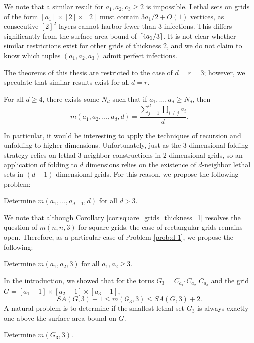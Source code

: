 We note that a similar result for $a_1, a_2,a_3 \geq 2$ is impossible. Lethal sets on grids of the form $[a_1] \times [2] \times [2]$ must contain $3a_1/2+O(1)$ vertices, as consecutive $[2]^2$ layers cannot harbor fewer than 3 infections. This differs significantly from the surface area bound of $\lceil4a_1/3\rceil$. It is not clear whether similar restrictions exist for other grids of thickness 2, and we do not claim to know which tuples $(a_1,a_2,a_3)$ admit perfect infections. 

The theorems of this thesis are restricted to the case of $d=r=3$; however, we speculate that similar results exist for all $d=r$. 

\begin{conj}
For all $d \geq 4$, there exists some $N_d$ such that if $a_1, \dots, a_d \geq N_d$, then
$$m(a_1,a_2, \dots, a_d,d) = \frac{\sum_{j=1}^d \prod_{i \neq j} a_i}{d}.$$
\end{conj}

In particular, it would be interesting to apply the techniques of recursion and unfolding to higher dimensions. Unfortunately, just as the 3-dimensional folding strategy relies on lethal 3-neighbor constructions in 2-dimensional grids, so an application of folding to $d$ dimensions relies on the existence of $d$-neighbor lethal sets in $(d-1)$-dimensional grids. For this reason, we propose the following problem:

\begin{prob}
\label{prob:d-1}
Determine $m(a_1, \dots, a_{d-1}, d)$ for all $d > 3$.
\end{prob}

We note that although Corollary \ref{cor:square_grids_thickness_1} resolves the question of $m(n,n,3)$ for square grids, the case of rectangular grids remains open. Therefore, as a particular case of Problem \ref{prob:d-1}, we propose the following:

\begin{prob}
\label{prob:rectangular_2d}
Determine $m(a_1,a_2, 3)$ for all $a_1,a_2 \geq 3$.
\end{prob}


In the introduction, we showed that for the torus $G_{3} = C_{a_1} \square C_{a_2} \square C_{a_3}$ and the grid $G = [a_1-1] \times [a_2-1] \times [a_3-1]$,
$$SA(G, 3) + 1 \leq m(G_3,3) \leq SA(G,3)+2.$$
A natural problem is to determine if the smallest lethal set $G_3$ is always exactly one above the surface area bound on $G$.

\begin{prob}
Determine $m(G_3,3)$.
\end{prob}



